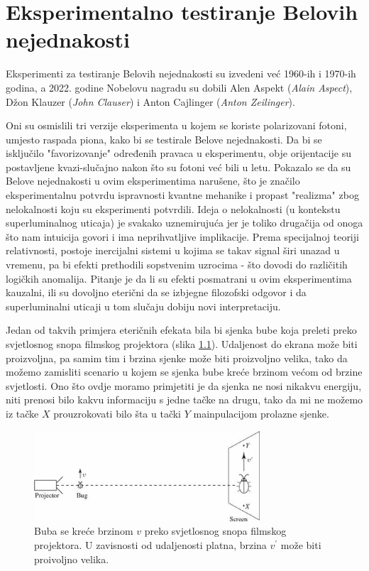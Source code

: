 \chapter{Eksperimentalno testiranje Belovih nejednakosti}


Eksperimenti za testiranje Belovih nejednakosti su izvedeni ve\' c 1960-ih i 1970-ih godina, a 2022. godine Nobelovu
nagradu su dobili Alen Aspekt (\textit{Alain Aspect}), D\v zon Klauzer (\textit{John Clauser}) i Anton Cajlinger (\textit{Anton Zeilinger}).

Oni su osmislili tri verzije eksperimenta u kojem se koriste polarizovani fotoni, umjesto raspada piona,
kako bi se testirale Belove nejednakosti. Da bi se isklju\v cilo "favorizovanje" određenih pravaca u eksperimentu, obje orijentacije su
postavljene kvazi-slu\v cajno nakon \v sto su fotoni ve\' c bili u letu.
Pokazalo se da su Belove nejednakosti u ovim eksperimentima naru\v sene, \v sto je zna\v cilo eksperimentalnu potvrdu
ispravnosti kvantne mehanike i propast "realizma" zbog nelokalnosti koju su eksperimenti potvrdili.
Ideja o nelokalnosti (u kontekstu superluminalnog uticaja) je svakako uznemiruju\' ca jer je toliko druga\v cija od onoga \v sto nam intuicija govori i ima neprihvatljive implikacije.
Prema specijalnoj teoriji relativnosti, postoje inercijalni sistemi u kojima se takav signal \v siri unazad u vremenu, pa bi efekti prethodili sopstvenim uzrocima - \v sto dovodi do
razli\v citih logi\v ckih anomalija.
Pitanje je da li su efekti posmatrani u ovim eksperimentima kauzalni, ili su dovoljno eteri\v cni da se izbjegne filozofski odgovor i da superluminalni uticaji u tom slu\v caju
dobiju novi interpretaciju.

Jedan od takvih primjera eteri\v cnih efekata bila bi sjenka bube koja preleti preko svjetlosnog snopa filmskog projektora (slika \ref{fig:bug_on_screen}). Udaljenost do ekrana mo\v ze biti proizvoljna, pa samim tim i brzina sjenke
mo\v ze biti proizvoljno velika, tako da mo\v zemo zamisliti scenario u kojem se sjenka bube kre\' ce brzinom ve\' com od brzine svjetlosti.
Ono \v sto ovdje moramo primjetiti je da sjenka ne nosi nikakvu energiju, niti prenosi bilo kakvu informaciju s jedne ta\v cke na drugu, tako da mi ne mo\v zemo iz ta\v cke $X$ prouzrokovati bilo
\v sta u ta\v cki $Y$ mainpulacijom prolazne sjenke.

\begin{figure}[H]
    \centering
    \includegraphics[width=0.75\textwidth]{figures/bug_on_screen.eps}
    \caption{Buba se kre\' ce brzinom $v$ preko svjetlosnog snopa filmskog projektora. U zavisnosti od udaljenosti platna, brzina $v^{'}$ mo\v ze biti proivoljno velika.}
    \label{fig:bug_on_screen}
\end{figure}

